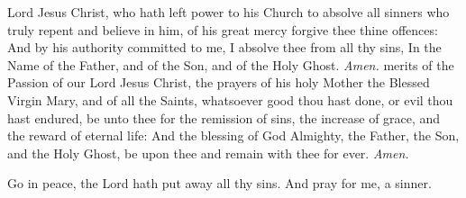 \begin{multicols}{2}
\par\noindent
 Lord Jesus Christ, who hath left power to his Church to absolve all sinners who truly repent and believe in him, of his great mercy forgive thee thine offences: And by his authority committed to me, I absolve thee from all thy sins, In the Name of the Father, {} and of the Son, and of the Holy Ghost. \textit{Amen.}%
 merits of the Passion of our Lord Jesus Christ, the prayers of his holy Mother the Blessed Virgin Mary, and of all the Saints, whatsoever good thou hast done, or evil thou hast endured, be unto thee for the remission of sins, the increase of grace, and the reward of eternal life: And the blessing of God Almighty, the Father, {} the Son, and the Holy Ghost, be upon thee and remain with thee for ever. \textit{Amen.}%
\par\noindent
\begin{center}
	Go in peace, the Lord hath put away all thy sins. 
	And pray for me, a sinner.
\end{center}
\end{multicols}
